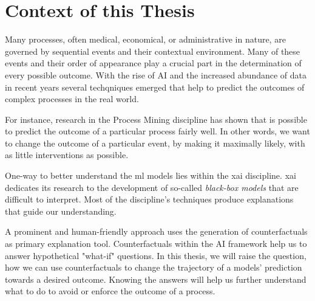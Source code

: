 \section{Context of this Thesis}
Many processes, often medical, economical, or administrative in nature, are governed by sequential events and their contextual environment. Many of these events and their order of appearance play a crucial part in the determination of every possible outcome. With the rise of AI and the increased abundance of data in recent years several techqniques emerged that help to predict the outcomes of complex processes in the real world.

For instance, research in the Process Mining discipline has shown that is possible to predict the outcome of a particular process fairly well\needscite.  In other words, we want to change the outcome of a particular event, by making it maximally likely, with as little interventions as possible. 

One-way to better understand the \gls{ml} models lies within the \gls{xai} discipline. \gls{xai} dedicates its research to the  development of so-called \emph{black-box models} that are  difficult to interpret. Most of the discipline's techniques produce explanations that guide our understanding.

A prominent and human-friendly approach uses the generation of counterfactuals as primary explanation tool. Counterfactuals within the AI framework help us to answer hypothetical "what-if" questions. In this thesis, we will raise the question, how we can use counterfactuals to change the trajectory of a models' prediction towards a desired outcome.  
Knowing the answers will help us further understand what to do to avoid or enforce the outcome of a process.